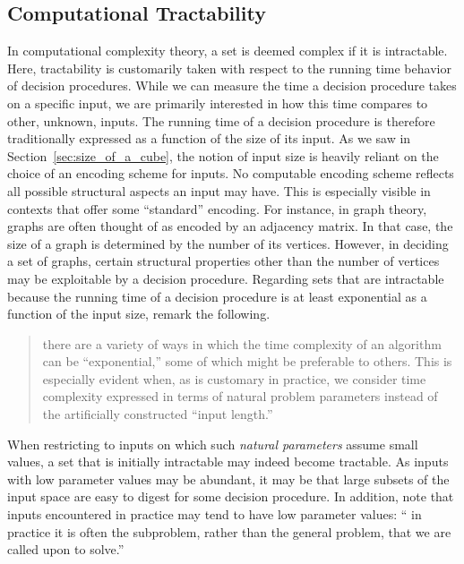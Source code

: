 \subsection{Computational Tractability}
\label{sec:history:tractability}%
In computational complexity theory, a set is deemed complex if it is intractable.
Here, tractability is customarily taken with respect to the running time behavior of decision procedures.
While we can measure the time a decision procedure takes on a specific input, we are primarily interested in how this time compares to other, unknown, inputs.
The running time of a decision procedure is therefore traditionally expressed as a function of the size of its input.
As we saw in Section~\ref{sec:size_of_a_cube}, the notion of input size is heavily reliant on the choice of an encoding scheme for inputs.
No computable encoding scheme reflects all possible structural aspects an input may have.
This is especially visible in contexts that offer some \enquote{standard} encoding.
For instance, in graph theory, graphs are often thought of as encoded by an adjacency matrix.
In that case, the size of a graph is determined by the number of its vertices.
However, in deciding a set of graphs, certain structural properties other than the number of vertices may be exploitable by a decision procedure.
Regarding sets that are intractable because the running time of a decision procedure is at least exponential as a function of the input size, \citeauthor{garey1979computers} remark the following.
\blockcquote[Section~4.3]{garey1979computers}{
  \textelp{} there are a variety of ways in which the time complexity of an algorithm can be \enquote{exponential,} some of which might be preferable to others.
  This is especially evident when, as is customary in practice, we consider time complexity expressed in terms of natural problem parameters instead of the artificially constructed \enquote{input length.}
}
When restricting to inputs on which such \emph{natural parameters} assume small values, a set that is initially intractable may indeed become tractable.
As inputs with low parameter values may be abundant, it may be that large subsets of the input space are easy to digest for some decision procedure.
In addition, \citeauthor{garey1979computers} note that inputs encountered in practice may tend to have low parameter values:
\enquote{\textelp{} in practice it is often the subproblem, rather than the general problem, that we are called upon to solve.}

